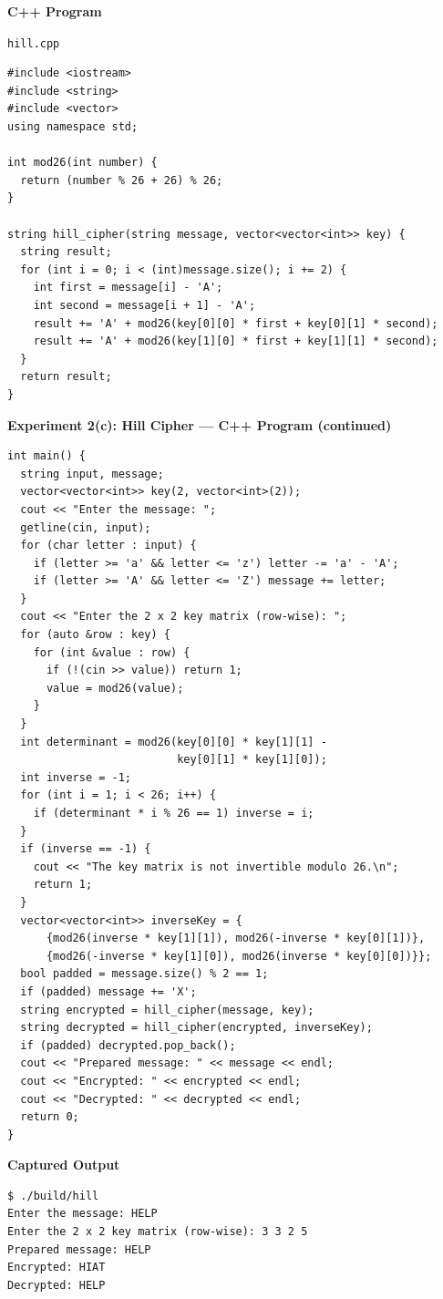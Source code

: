 \documentclass[11pt,a4paper]{article}
\newcommand{\blocktitle}[1]{\Needspace{6\baselineskip}\par\textbf{#1}\par}
\begin{document}
\blocktitle{C++ Program}
{\small\texttt{hill.cpp}\par}
\begin{lstlisting}[style=cpp]
#include <iostream>
#include <string>
#include <vector>
using namespace std;

int mod26(int number) {
  return (number % 26 + 26) % 26;
}

string hill_cipher(string message, vector<vector<int>> key) {
  string result;
  for (int i = 0; i < (int)message.size(); i += 2) {
    int first = message[i] - 'A';
    int second = message[i + 1] - 'A';
    result += 'A' + mod26(key[0][0] * first + key[0][1] * second);
    result += 'A' + mod26(key[1][0] * first + key[1][1] * second);
  }
  return result;
}
\end{lstlisting}
\clearpage
\textbf{Experiment 2(c): Hill Cipher --- C++ Program (continued)}\par
\begin{lstlisting}[style=cpp]
int main() {
  string input, message;
  vector<vector<int>> key(2, vector<int>(2));
  cout << "Enter the message: ";
  getline(cin, input);
  for (char letter : input) {
    if (letter >= 'a' && letter <= 'z') letter -= 'a' - 'A';
    if (letter >= 'A' && letter <= 'Z') message += letter;
  }
  cout << "Enter the 2 x 2 key matrix (row-wise): ";
  for (auto &row : key) {
    for (int &value : row) {
      if (!(cin >> value)) return 1;
      value = mod26(value);
    }
  }
  int determinant = mod26(key[0][0] * key[1][1] -
                          key[0][1] * key[1][0]);
  int inverse = -1;
  for (int i = 1; i < 26; i++) {
    if (determinant * i % 26 == 1) inverse = i;
  }
  if (inverse == -1) {
    cout << "The key matrix is not invertible modulo 26.\n";
    return 1;
  }
  vector<vector<int>> inverseKey = {
      {mod26(inverse * key[1][1]), mod26(-inverse * key[0][1])},
      {mod26(-inverse * key[1][0]), mod26(inverse * key[0][0])}};
  bool padded = message.size() % 2 == 1;
  if (padded) message += 'X';
  string encrypted = hill_cipher(message, key);
  string decrypted = hill_cipher(encrypted, inverseKey);
  if (padded) decrypted.pop_back();
  cout << "Prepared message: " << message << endl;
  cout << "Encrypted: " << encrypted << endl;
  cout << "Decrypted: " << decrypted << endl;
  return 0;
}
\end{lstlisting}
\par\begin{minipage}{\linewidth}
\textbf{Captured Output}\par
\begin{lstlisting}[style=terminal]
$ ./build/hill
Enter the message: HELP
Enter the 2 x 2 key matrix (row-wise): 3 3 2 5
Prepared message: HELP
Encrypted: HIAT
Decrypted: HELP
\end{lstlisting}
\end{minipage}
\end{document}
